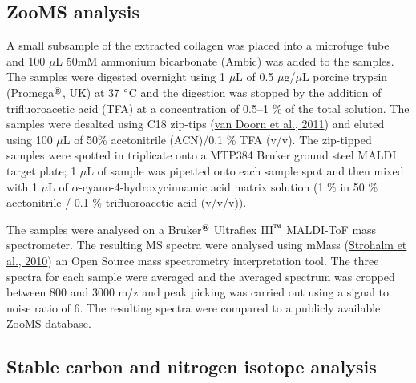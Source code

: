 \documentclass[preprint, 3p, authoryear]{elsarticle} %
\begin{document}
\hypertarget{zooms-analysis}{%
\subsection{ZooMS analysis}\label{zooms-analysis}}

A small subsample of the extracted collagen was placed into a microfuge tube and 100 \(\mu\)L 50mM ammonium bicarbonate (Ambic) was added to the samples. The samples were digested overnight using 1 \(\mu\)L of 0.5 \(\mu\)g/\(\mu\)L porcine trypsin (Promega\(^\text{\textregistered}\), UK) at 37 \(\text{\textdegree}\)C and the digestion was stopped by the addition of trifluoroacetic acid (TFA) at a concentration of 0.5--1 \% of the total solution. The samples were desalted using C18 zip-tips (\protect\hyperlink{ref-vandoorn_etal11}{van Doorn et al., 2011}) and eluted using 100 \(\mu\)L of 50\% acetonitrile (ACN)/0.1 \% TFA (v/v). The zip-tipped samples were spotted in triplicate onto a MTP384 Bruker ground steel MALDI target plate; 1 \(\mu\)L of sample was pipetted onto each sample spot and then mixed with 1 \(\mu\)L of \(\alpha\)-cyano-4-hydroxycinnamic acid matrix solution (1 \% in 50 \% acetonitrile / 0.1 \% trifluoroacetic acid (v/v/v)).

The samples were analysed on a Bruker\(^\text{\textregistered}\) Ultraflex III\(^\text{\texttrademark}\) MALDI-ToF mass spectrometer. The resulting MS spectra were analysed using mMass (\protect\hyperlink{ref-strohalm_etal10}{Strohalm et al., 2010}) an Open Source mass spectrometry interpretation tool. The three spectra for each sample were averaged and the averaged spectrum was cropped between 800 and 3000 m/z and peak picking was carried out using a signal to noise ratio of 6. The resulting spectra were compared to a publicly available ZooMS database.

\hypertarget{stable-carbon-and-nitrogen-isotope-analysis}{%
\subsection{Stable carbon and nitrogen isotope analysis}\label{stable-carbon-and-nitrogen-isotope-analysis}}
\end{document}
